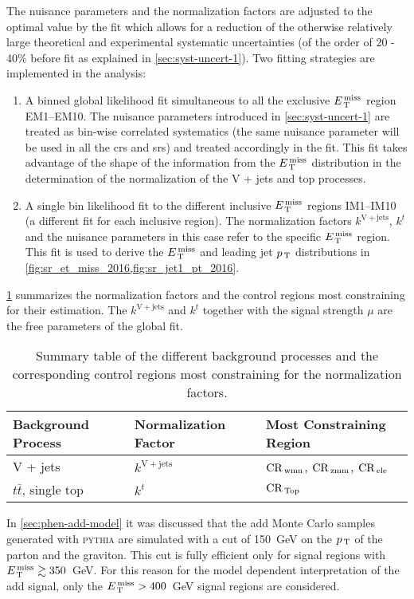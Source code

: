 The nuisance parameters and the normalization factors are adjusted to the
optimal value by the fit which allows for a reduction of the otherwise
relatively large theoretical and experimental systematic uncertainties (of the
order of 20 - 40\% before fit as explained in \cref{sec:syst-uncert-1}). Two
fitting strategies are implemented in the analysis:
\begin{enumerate}[A -]
\item A binned global likelihood fit simultaneous to all the exclusive $E_\mathrm{\, T}^\mathrm{\, miss}$
  region EM1--EM10. The nuisance parameters introduced in
  \cref{sec:syst-uncert-1} are treated as bin-wise correlated systematics (the
  same nuisance parameter will be used in all the \glspl{cr} and \glspl{sr}) and
  treated accordingly in the fit. This fit takes advantage of the shape of the
  information from the $E_\mathrm{\, T}^\mathrm{\, miss}$ distribution in the determination of the
  normalization of the V + jets and top processes.
\item A single bin likelihood fit to the different inclusive $E_\mathrm{\, T}^\mathrm{\, miss}$ regions
  IM1--IM10 (a different fit for each inclusive region). The normalization
  factors $k^\mathrm{V + jets}$, $k^t$ and the nuisance parameters in this case
  refer to the specific $E_\mathrm{\, T}^\mathrm{\, miss}$ region. This fit is used to derive the $E_\mathrm{\, T}^\mathrm{\, miss}$ and
  leading jet $p_\mathrm{\, T}$ distributions in
  \cref{fig:sr_et_miss_2016,fig:sr_jet1_pt_2016}.
\end{enumerate}
\cref{tab:norm_factors_2016} summarizes the normalization factors and the
control regions most constraining for their estimation. The
$k^\mathrm{V + jets}$ and $k^t$ together with the signal strength $\mu$ are the
free parameters of the global fit.
\begin{table}[!h]
  \centering
  \begin{tabular}{lll}
    \toprule
    Background Process & Normalization Factor & Most Constraining Region \\
    \midrule \midrule
    V + jets & $k^\mathrm{V + jets}$ & $\mathrm{CR}_\mathrm{\, wmn}$, $\mathrm{CR}_\mathrm{\, zmm}$, $\mathrm{CR}_\mathrm{\, ele}$ \\
    $t \bar{t}$, single top & $k^t$ & $\mathrm{CR}_\mathrm{\, Top}$ \\
    \bottomrule
  \end{tabular}
  \caption{Summary table of the different background processes and the
    corresponding control regions most constraining for the normalization
    factors.}
  \label{tab:norm_factors_2016}
\end{table}

In \cref{sec:phen-add-model} it was discussed that the \gls{add} Monte Carlo
samples generated with \textsc{pythia} are simulated with a cut of 150~GeV on
the $p_\mathrm{\, T}$ of the parton and the graviton. This cut is fully efficient only for
signal regions with $E_\mathrm{\, T}^\mathrm{\, miss} \gtrsim 350$~GeV. For this reason for the model
dependent interpretation of the \gls{add} signal, only the $E_\mathrm{\, T}^\mathrm{\, miss} > 400$~GeV
signal regions are considered.
